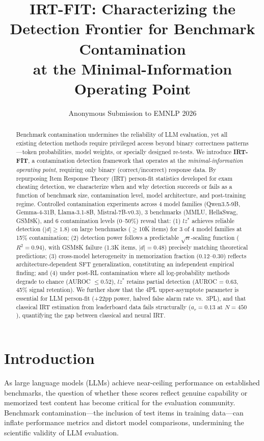 \documentclass[11pt]{article}
\title{IRT-FIT: Characterizing the Detection Frontier for Benchmark Contamination\\ at the Minimal-Information Operating Point}
\author{
Anonymous Submission to EMNLP 2026
}
\date{}
\begin{document}
\maketitle

\begin{abstract}
Benchmark contamination undermines the reliability of LLM evaluation, yet all existing detection methods require privileged access beyond binary correctness patterns---token probabilities, model weights, or specially designed re-tests.
We introduce \textbf{IRT-FIT}, a contamination detection framework that operates at the \emph{minimal-information operating point}, requiring only binary (correct/incorrect) response data.
By repurposing Item Response Theory (IRT) person-fit statistics developed for exam cheating detection, we characterize when and why detection succeeds or fails as a function of benchmark size, contamination level, model architecture, and post-training regime.
Controlled contamination experiments across 4 model families (Qwen3.5-9B, Gemma-4-31B, Llama-3.1-8B, Mistral-7B-v0.3), 3 benchmarks (MMLU, HellaSwag, GSM8K), and 6 contamination levels (0--50\%) reveal that: (1) $lz^*$ achieves reliable detection ($|d| \geq 1.8$) on large benchmarks ($\geq$10K items) for 3 of 4 model families at 15\% contamination; (2) detection power follows a predictable $\sqrt{n}$-scaling function ($R^2 = 0.94$), with GSM8K failure (1.3K items, $|d| = 0.48$) precisely matching theoretical predictions; (3) cross-model heterogeneity in memorization fraction (0.12--0.30) reflects architecture-dependent SFT generalization, constituting an independent empirical finding; and (4) under post-RL contamination where all log-probability methods degrade to chance (AUROC $\leq 0.52$), $lz^*$ retains partial detection (AUROC = 0.63, 45\% signal retention).
We further show that the 4PL upper-asymptote parameter is essential for LLM person-fit (+22pp power, halved false alarm rate vs.\ 3PL), and that classical IRT estimation from leaderboard data fails structurally ($a_r = 0.13$ at $N = 450$), quantifying the gap between classical and neural IRT.
\end{abstract}

\section{Introduction}
\label{sec:intro}

As large language models (LLMs) achieve near-ceiling performance on established benchmarks, the question of whether these scores reflect genuine capability or memorized test content has become critical for the evaluation community.
Benchmark contamination---the inclusion of test items in training data---can inflate performance metrics and distort model comparisons, undermining the scientific validity of LLM evaluation.
\end{document}

